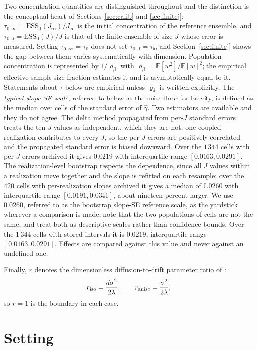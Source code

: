 \documentclass[pdflatex,sn-mathphys-num]{sn-jnl}
\theoremstyle{thmstyleone}
\theoremstyle{thmstyletwo}
\theoremstyle{thmstylethree}
\begin{document}
Two concentration quantities are distinguished throughout and the distinction is the conceptual heart of Sections~\ref{sec:calib} and \ref{sec:finitej}: $\tau_{0,\infty}=\mathrm{ESS}_0(J_\infty)/J_\infty$ is the initial concentration of the reference ensemble, and $\tau_{0,J}=\mathrm{ESS}_0(J)/J$ is that of the finite ensemble of size $J$ whose error is measured. Setting $\tau_{0,\infty}=\tau_0$ does not set $\tau_{0,J}=\tau_0$, and Section~\ref{sec:finitej} shows the gap between them varies systematically with dimension. Population concentration is represented by $1/\varrho_\beta$ with $\varrho_\beta=\mathbb E[w^2]/\mathbb E[w]^2$; the empirical effective sample size fraction estimates it and is asymptotically equal to it. Statements about $\tau$ below are empirical unless $\varrho_\beta$ is written explicitly. The \emph{typical slope-SE scale}, referred to below as the noise floor for brevity, is defined as the median over cells of the standard error of $\hat\gamma$. Two estimators are available and they do not agree. The delta method propagated from per-$J$ standard errors treats the ten $J$ values as independent, which they are not: one coupled realization contributes to every $J$, so the per-$J$ errors are positively correlated and the propagated standard error is biased downward. Over the $1\,344$ cells with per-$J$ errors archived it gives $0.0219$ with interquartile range $[0.0163,0.0291]$. The realization-level bootstrap respects the dependence, since all $J$ values within a realization move together and the slope is refitted on each resample; over the $420$ cells with per-realization slopes archived it gives a median of $0.0260$ with interquartile range $[0.0191,0.0341]$, about nineteen percent larger. We use $0.0260$, referred to as the bootstrap slope-SE reference scale, as the yardstick wherever a comparison is made, note that the two populations of cells are not the same, and treat both as descriptive scales rather than confidence bounds. Over the $1\,344$ cells with stored intervals it is $0.0219$, interquartile range $[0.0163,0.0291]$. Effects are compared against this value and never against an undefined one.

Finally, $r$ denotes the dimensionless diffusion-to-drift parameter ratio of \cite[Theorem 3.7]{fkr2024}:
\[
r_{\rm iso}=\frac{d\sigma^2}{2\lambda},\qquad r_{\rm aniso}=\frac{\sigma^2}{2\lambda},
\]
so $r=1$ is the boundary in each case.

\section{Setting}\label{sec2}
\end{document}
